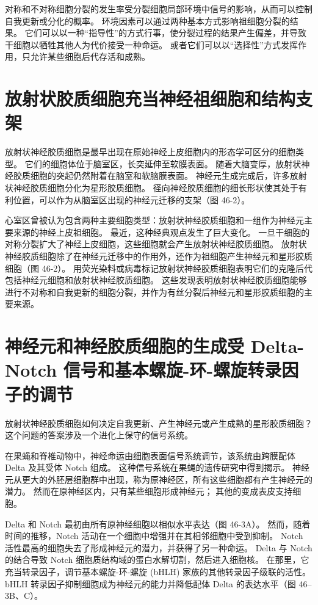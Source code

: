 对称和不对称细胞分裂的发生率受分裂细胞局部环境中信号的影响，从而可以控制自我更新或分化的概率。 环境因素可以通过两种基本方式影响祖细胞分裂的结果。 它们可以以一种“指导性”的方式行事，使分裂过程的结果产生偏差，并导致干细胞以牺牲其他人为代价接受一种命运。 或者它们可以以“选择性”方式发挥作用，只允许某些细胞后代存活和成熟。

\section{放射状胶质细胞充当神经祖细胞和结构支架}
放射状神经胶质细胞是最早出现在原始神经上皮细胞内的形态学可区分的细胞类型。 它们的细胞体位于脑室区，长突延伸至软膜表面。 随着大脑变厚，放射状神经胶质细胞的突起仍然附着在脑室和软脑膜表面。 神经元生成完成后，许多放射状神经胶质细胞分化为星形胶质细胞。 径向神经胶质细胞的细长形状使其处于有利位置，可以作为从脑室区出现的神经元迁移的支架（图 46-2）。

心室区曾被认为包含两种主要细胞类型：放射状神经胶质细胞和一组作为神经元主要来源的神经上皮祖细胞。 最近，这种经典观点发生了巨大变化。 一旦干细胞的对称分裂扩大了神经上皮细胞，这些细胞就会产生放射状神经胶质细胞。 放射状神经胶质细胞除了在神经元迁移中的作用外，还作为祖细胞产生神经元和星形胶质细胞（图 46-2）。 用荧光染料或病毒标记放射状神经胶质细胞表明它们的克隆后代包括神经元细胞和放射状神经胶质细胞。 这些发现表明放射状神经胶质细胞能够进行不对称和自我更新的细胞分裂，并作为有丝分裂后神经元和星形胶质细胞的主要来源。


\section{神经元和神经胶质细胞的生成受 Delta-Notch 信号和基本螺旋-环-螺旋转录因子的调节}
放射状神经胶质细胞如何决定自我更新、产生神经元或产生成熟的星形胶质细胞？ 这个问题的答案涉及一个进化上保守的信号系统。

在果蝇和脊椎动物中，神经命运由细胞表面信号系统调节，该系统由跨膜配体 Delta 及其受体 Notch 组成。 这种信号系统在果蝇的遗传研究中得到揭示。 神经元从更大的外胚层细胞群中出现，称为原神经区，所有这些细胞都有产生神经元的潜力。 然而在原神经区内，只有某些细胞形成神经元； 其他的变成表皮支持细胞。

Delta 和 Notch 最初由所有原神经细胞以相似水平表达（图 46-3A）。 然而，随着时间的推移，Notch 活动在一个细胞中增强并在其相邻细胞中受到抑制。 Notch 活性最高的细胞失去了形成神经元的潜力，并获得了另一种命运。 Delta 与 Notch 的结合导致 Notch 细胞质结构域的蛋白水解切割，然后进入细胞核。 在那里，它充当转录因子，调节基本螺旋-环-螺旋 (bHLH) 家族的其他转录因子级联的活性。 bHLH 转录因子抑制细胞成为神经元的能力并降低配体 Delta 的表达水平（图 46–3B、C）。

